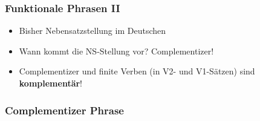 \begin{frame}
	\frametitle{Funktionale Phrasen II}
	
	\begin{itemize}
		\item Bisher \ras Nebensatzstellung im Deutschen
		\item Wann kommt die NS-Stellung vor? \ras Complementizer!
		
		\eal
		\zl
		
		\item Complementizer und finite Verben (in V2- und V1-Sätzen) sind \textbf{komplementär}!
		
	\end{itemize}
	
\end{frame}


\subsubsection{Complementizer Phrase}

